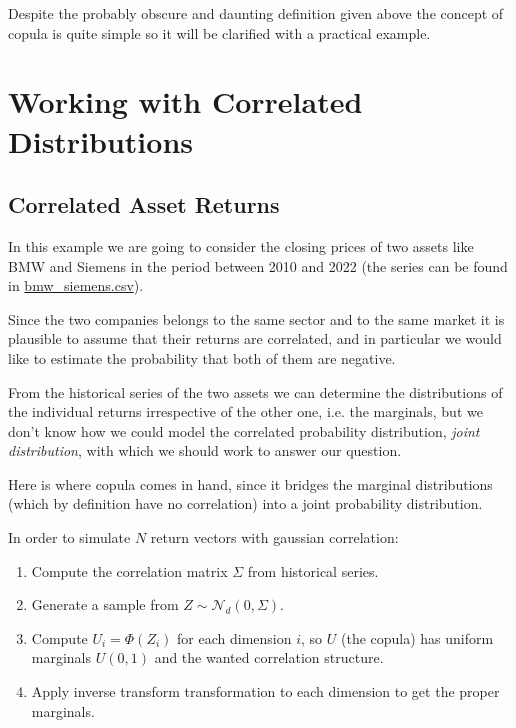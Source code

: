 Despite the probably obscure and daunting definition given above the concept of copula is quite simple so it will be clarified with a practical example.

\section{Working with Correlated Distributions}
\label{sec:generate-correlated-distributions}

\subsection{Correlated Asset Returns}
\label{sec:correlated_stock_returns}

In this example we are going to consider the closing prices of two assets like BMW and Siemens in the period between 2010 and 2022 (the series can be found in \href{https://github.com/matteosan1/finance_course/raw/master/input_files/bmw_siemens.csv}{bmw\_siemens.csv}).

Since the two companies belongs to the same sector and to the same market it is plausible to assume that their returns are correlated, and in particular we would like to estimate the probability that both of them are negative.

From the historical series of the two assets we can determine the distributions of the individual returns irrespective of the other one, i.e. the marginals, but we don't know how we could model the correlated probability distribution, \emph{joint distribution}, with which we should work to answer our question. 

Here is where copula comes in hand, since it bridges the marginal distributions (which by definition have no correlation) into a joint probability distribution. 

In order to simulate $N$ return vectors with gaussian correlation:
\begin{enumerate}
\item Compute the correlation matrix $\Sigma$ from historical series.
\item Generate a sample from $Z \sim \mathcal{N}_d(0, \Sigma)$.
\item Compute $U_i = \Phi(Z_i)$ for each dimension $i$, so $U$ (the copula) has uniform marginals $U(0,1)$ and the wanted correlation structure.
\item Apply inverse transform transformation to each dimension to get the proper marginals.
\end{enumerate}

